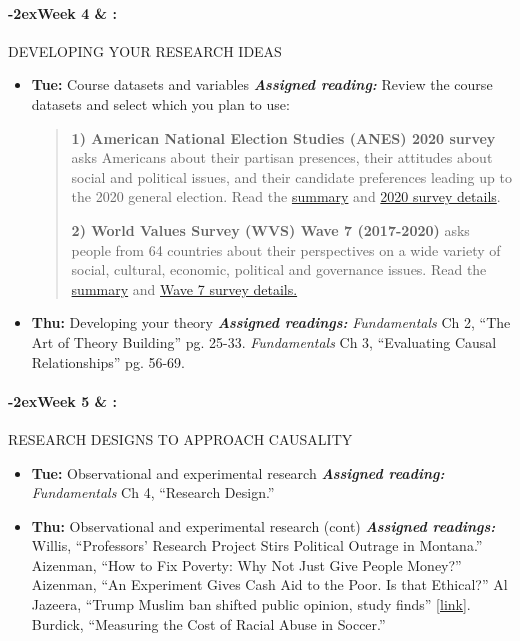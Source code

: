 \documentclass[11pt]{article}
\newcommand{\week}[1]{%
  \paragraph*{\kern-2ex\quad #1 \AdvanceDate[1]\syldate{\today} \& \AdvanceDate[2]\syldate{\today} :}%
  \ifdim\wd1=\wd\MONDAY
    \AdvanceDate[7]
  \else
    \AdvanceDate[7]
  \fi%
}
\begin{document}
\week{Week 4} DEVELOPING YOUR RESEARCH IDEAS
\begin{itemize}
    \item [] \textbf{Tue:} Course datasets and variables
        \subitem \textit{\textbf{Assigned reading:}} Review the course datasets and select which you plan to use:\vspace{-2pt}\begin{quotation}\noindent \textbf{1) American National Election Studies (ANES) 2020 survey} asks Americans about their partisan presences, their attitudes about social and political issues, and their candidate preferences leading up to the 2020 general election. Read the \href{https://electionstudies.org/about-us/}{summary} and \href{https://electionstudies.org/data-center/2020-time-series-study/}{2020 survey details}. 
        
        \vspace{5pt}\noindent \textbf{2) World Values Survey (WVS) Wave 7 (2017-2020)} asks people from 64 countries about their perspectives on a wide variety of social, cultural, economic, political and governance issues. Read the \href{https://www.worldvaluessurvey.org/WVSContents.jsp}{summary} and \href{https://www.worldvaluessurvey.org/WVSContents.jsp}{Wave 7 survey details.}
        \end{quotation}
    \item [] \textbf{Thu:} Developing your theory
        \subitem \textbf{\textit{Assigned readings:}}
        \subsubitem \textit{Fundamentals} Ch 2, ``The Art of Theory Building'' pg. 25-33.
        \subsubitem \textit{Fundamentals} Ch 3, ``Evaluating Causal Relationships'' pg. 56-69.
\end{itemize}

\week{Week 5} RESEARCH DESIGNS TO APPROACH CAUSALITY

\begin{itemize}
\item [] \textbf{Tue:} Observational and experimental research
    \subitem \textbf{\textit{Assigned reading:}} \textit{Fundamentals} Ch 4, ``Research Design.''
\item [] \textbf{Thu:} Observational and experimental research (cont)
    \subitem \textbf{\textit{Assigned readings:}}
    \subsubitem Willis, ``Professors’ Research Project Stirs Political Outrage in Montana.''
    \subsubitem Aizenman, ``How to Fix Poverty: Why Not Just Give People Money?'' 
    \subsubitem Aizenman, ``An Experiment Gives Cash Aid to the Poor. Is that Ethical?''
    \subsubitem Al Jazeera, ``Trump Muslim ban shifted public opinion, study finds'' \href{https://www.aljazeera.com/news/2018/1/13/trump-muslim-ban-shifted-public-opinion-study-finds}{[link]}.
    \subsubitem Burdick, ``Measuring the Cost of Racial Abuse in Soccer.''
\end{itemize}
\end{document}
